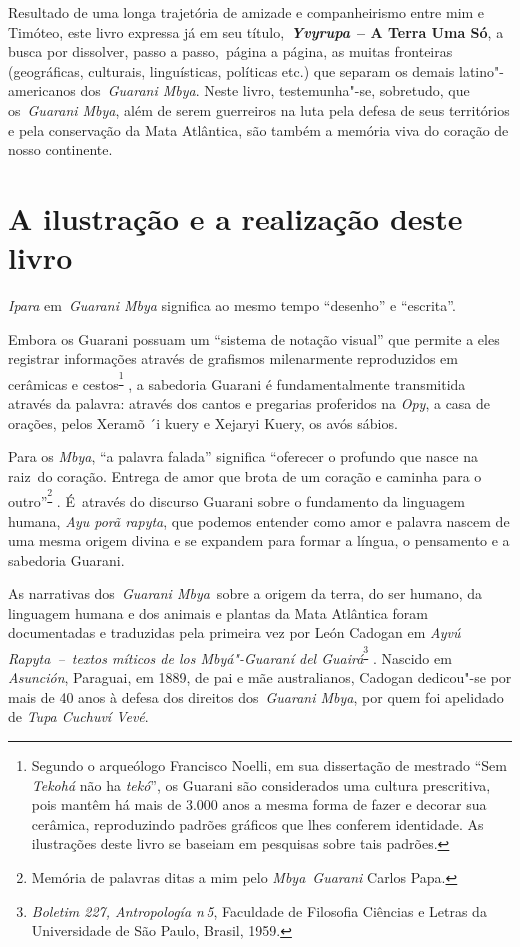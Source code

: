 Resultado de uma longa trajetória de amizade e companheirismo entre mim
e Timóteo, este livro expressa já em seu
título,~\emph{\textbf{Yvyrupa}}~\textbf{-- A Terra Uma Só}, a busca por
dissolver, passo a passo,~página a página, as muitas fronteiras
(geográficas, culturais, linguísticas, políticas etc.) que separam os
demais latino"-americanos dos~\emph{Guarani Mbya}. Neste livro,
testemunha"-se, sobretudo, que os~\emph{Guarani Mbya}, além de serem
guerreiros na luta pela defesa de seus territórios e pela conservação da
Mata Atlântica, são também a memória viva do coração de nosso
continente.

 

 

\section{A ilustração e a realização deste livro}

\emph{Ipara} em~\emph{Guarani Mbya} significa ao mesmo tempo ``desenho''
e ``escrita''.

Embora os Guarani possuam um ``sistema de notação visual'' que permite a
eles registrar informações através de grafismos milenarmente
reproduzidos em cerâmicas e cestos\textsuperscript{\footnote{Segundo o arqueólogo Francisco Noelli, em sua dissertação de mestrado
``Sem \emph{Tekohá} não ha \emph{tekó}'', os Guarani são considerados
uma cultura prescritiva, pois mantêm há mais de 3.000 anos a mesma forma
de fazer e decorar sua cerâmica, reproduzindo padrões gráficos que lhes
conferem identidade. As ilustrações deste livro se baseiam em pesquisas
sobre tais padrões.} },
a sabedoria Guarani é fundamentalmente transmitida através da palavra:
através dos cantos e pregarias proferidos na \emph{Opy}, a casa de
orações, pelos Xeramõ ´i kuery e Xejaryi Kuery, os avós sábios.

Para os \emph{Mbya}, ``a palavra falada'' significa ``oferecer o
profundo que nasce na raiz~do coração. Entrega de amor que brota de um
coração e caminha para o outro''\textsuperscript{\footnote{Memória de palavras ditas a mim pelo \emph{Mbya}~\emph{Guarani} Carlos
Papa.} }. É~através do discurso Guarani sobre o fundamento da linguagem humana,
\emph{Ayu porã rapyta}, que podemos entender como amor e palavra nascem
de uma mesma origem divina e se expandem para formar a língua, o
pensamento e a sabedoria Guarani.

As narrativas dos~\emph{Guarani Mbya}~sobre a origem da terra, do ser
humano, da linguagem humana e dos animais e plantas da Mata Atlântica
foram documentadas e traduzidas pela primeira vez por León Cadogan em
\emph{Ayvú Rapyta~--~textos míticos de los Mbyá"-Guaraní del
Guairá}\textsuperscript{\footnote{\emph{Boletim 227, Antropología n\,5}, Faculdade de Filosofia Ciências e
Letras da Universidade de São Paulo, Brasil, 1959.} }. Nascido em
\emph{Asunción}, Paraguai, em 1889, de pai e mãe australianos, Cadogan
dedicou"-se por mais de 40 anos à defesa dos direitos dos~\emph{Guarani
Mbya}, por quem foi apelidado de \emph{Tupa Cuchuví Vevé}.

